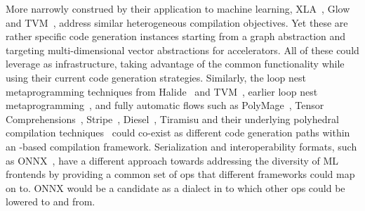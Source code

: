 More narrowly construed by their application to machine learning, XLA~\cite{xla},
Glow~\cite{rotem2018glow} and TVM~\cite{auto-tvm}, address
similar heterogeneous compilation objectives. Yet these are rather specific code generation instances starting
from a graph abstraction and targeting multi-dimensional vector abstractions for
accelerators. All of these could leverage \MLIR as infrastructure, taking advantage of
the common functionality while using their current code generation strategies.
Similarly, the loop nest metaprogramming techniques from Halide~\cite{halide}
and
TVM~\cite{auto-tvm}, earlier loop nest
metaprogramming~\cite{uruk,10.1007/978-3-642-19595-2_10,DBLP:conf/cgo/BagneresZHB16,Cohen:2006:SPG:1161486.1161489},
and fully automatic flows such as PolyMage~\cite{mullapudi2015asplos}, Tensor
Comprehensions~\cite{tc}, Stripe~\cite{plaidml}, Diesel~\cite{Elango:2018:DDL:3211346.3211354}, Tiramisu \cite{Bag19} and their underlying polyhedral compilation
techniques~\cite{Fea92b,isl,bondhugula08pldi,ppcg} could
co-exist as different code
generation paths within an \MLIR-based compilation framework.
Serialization and interoperability formats, such as ONNX~\cite{onnx}, have a
different approach towards addressing the diversity of ML frontends by providing
a common set of ops that different frameworks could map on to. ONNX would be a
candidate as a dialect in \MLIR to which other ops could be lowered to and from.
